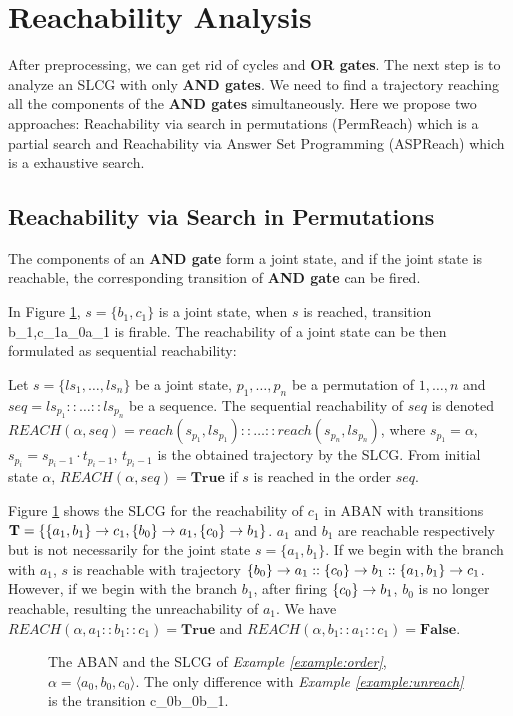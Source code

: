 \section{Reachability Analysis}
After preprocessing, we can get rid of cycles and \textbf{OR gates}.
The next step is to analyze an SLCG with only \textbf{AND gates}.
We need to find a trajectory reaching all the components of the \textbf{AND gates} simultaneously.
Here we propose two approaches: Reachability via search in permutations (PermReach) which is a partial search and Reachability via Answer Set Programming (ASPReach) which is a exhaustive search.
\subsection{Reachability via Search in Permutations}

The components of an \textbf{AND gate} form a joint state, and if the joint state is reachable, the corresponding transition of \textbf{AND gate} can be fired. 

In Figure \ref{fig:unreach}, $s=\{ b_1,c_1\}$ is a joint state, when $s$ is reached, transition \ac{b_1,c_1}{a_0}{a_1} is firable.
The reachability of a joint state can be then formulated as sequential reachability:
\begin{definition}
Let $s=\{ls_1,\ldots,ls_n\}$ be a joint state, $p_1,\ldots ,p_n$ be a permutation of $1,\ldots ,n$ and $seq=ls_{p_1}::\ldots::ls_{p_n}$ be a sequence.
The sequential reachability of $seq$ is denoted %
$REACH(\alpha,seq)=reach(s_{p_1},ls_{p_1})::\ldots::reach(s_{p_n},ls_{p_n})$, where $s_{p_1}=\alpha$, $s_{p_i}=s_{p_i-1}\cdot t_{p_i-1}$, $t_{p_i-1}$ is the obtained trajectory by the SLCG.
From initial state $\alpha$, $REACH(\alpha,seq)=\mathbf{True}$ if $s$ is reached in the order $seq$.
\end{definition}

\begin{example}\label{example:order}
Figure \ref{fig:unreach} shows the SLCG for the reachability of $c_1$ in ABAN with transitions $\mathbf{T}=\{\acm{a_1,b_1}{c_0}{c_1},\acm{b_0}{a_0}{a_1},\acm{c_0}{b_0}{b_1}\}$.
$a_1$ and $b_1$ are reachable respectively but is not necessarily for the joint state $s=\{a_1,b_1\}$.
If we begin with the branch with $a_1$, $s$ is reachable with trajectory $\acm{b_0}{a_0}{a_1}::\acm{c_0}{b_0}{b_1}::\acm{a_1,b_1}{c_0}{c_1}$. 
However, if we begin with the branch $b_1$, after firing $\acm{c_0}{b_0}{b_1}$, $b_0$ is no longer reachable, resulting the unreachability of $a_1$.
We have $REACH(\alpha,a_1::b_1::c_1)=\mathbf{True}$ and $REACH(\alpha,b_1::a_1::c_1)=\mathbf{False}$.
\end{example}
\begin{figure}[ht]
\centering

\caption[Ordering in SLCG]{The ABAN and the SLCG of \textit{Example \ref{example:order}}, $\alpha=\langle a_0,b_0,c_0\rangle$. 
The only difference with \textit{Example \ref{example:unreach}} is the transition \ac{c_0}{b_0}{b_1}.
}
\label{fig:unreach}
\end{figure}

